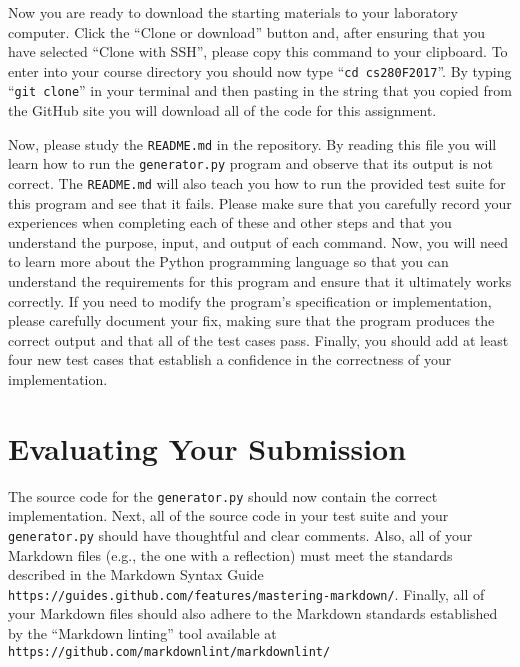 \documentclass[11pt]{article}
\newcommand{\mainprogram}{\lstinline{generator.py}}
\newcommand{\reflection}{\lstinline{README.md}}
\newcommand{\command}[1]{``\lstinline{#1}''}
\newcommand{\url}[1]{\lstinline{#1}}
\newcommand{\step}[1]{``{#1}''}
\begin{document}
Now you are ready to download the starting materials to your laboratory computer. Click the ``Clone or download'' button
and, after ensuring that you have selected ``Clone with SSH'', please copy this command to your clipboard. To enter into
your course directory you should now type \command{cd cs280F2017}. By typing \command{git clone} in your terminal and then
pasting in the string that you copied from the GitHub site you will download all of the code for this assignment.

Now, please study the \reflection{} in the repository. By reading this file you will learn how to run the \mainprogram{}
program and observe that its output is not correct. The \reflection{} will also teach you how to run the provided test
suite for this program and see that it fails. Please make sure that you carefully record your experiences when
completing each of these and other steps and that you understand the purpose, input, and output of each command. Now,
you will need to learn more about the Python programming language so that you can understand the requirements for this
program and ensure that it ultimately works correctly. If you need to modify the program's specification or
implementation, please carefully document your fix, making sure that the program produces the correct output and that
all of the test cases pass. Finally, you should add at least four new test cases that establish a confidence in the
correctness of your implementation.

\section*{Evaluating Your Submission}

The source code for the \mainprogram{} should now contain the correct implementation. Next, all of the source code in
your test suite and your \mainprogram{} should have thoughtful and clear comments. Also, all of your Markdown files
(e.g., the one with a reflection) must meet the standards described in the Markdown Syntax Guide
\url{https://guides.github.com/features/mastering-markdown/}. Finally, all of your Markdown files should also adhere to
the Markdown standards established by the \step{Markdown linting} tool available at
\url{https://github.com/markdownlint/markdownlint/}
\end{document}

